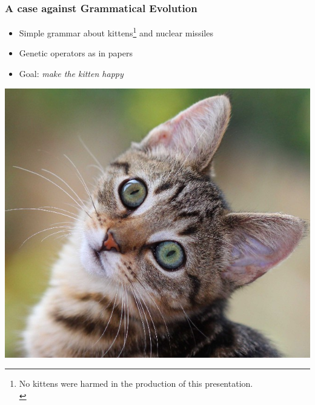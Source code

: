 \documentclass{beamer}
\begin{document}
\begin{frame}
\frametitle{A case against Grammatical Evolution}
\begin{itemize}
\item Simple grammar about kittens\footnote{No kittens were harmed in the production of this presentation.\\} and nuclear missiles
\item Genetic operators as in papers
\item Goal: \textit{make the kitten happy}
\end{itemize}

\begin{center}
	\includegraphics[scale=0.2]{kitten.jpg}
\end{center}

\end{frame}
\end{document}

